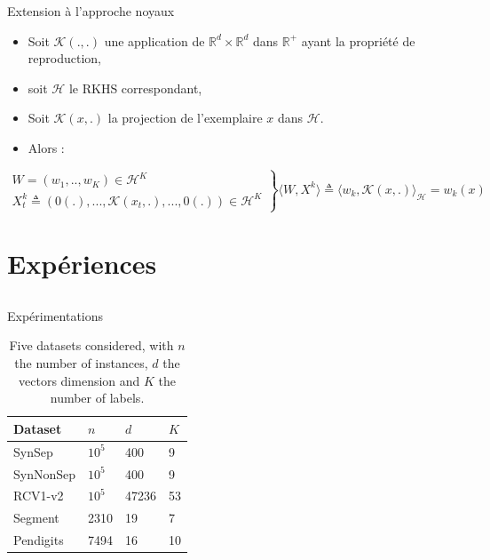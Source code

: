 \documentclass{beamer}
\begin{document}
\begin{frame}{Extension à l'approche noyaux}

	\begin{itemize}
		\item Soit $\mathcal{K}(.,.)$ une application de $ \mathbb{R}^d \times \mathbb{R}^d$ dans $ \mathbb{R}^+$ ayant la propriété de reproduction,
		\item soit $\mathcal{H}$ le RKHS correspondant,
	\item Soit $\mathcal{K}(x,.)$ la projection de l'exemplaire $x$ dans $\mathcal{H}$. 
	\item Alors : 
	\end{itemize}
	\begin{footnotesize}
	\begin{exampleblock}{}
		$
		\left.
		\begin{array}{l}
		W = (w_1,..,w_K) \in \mathcal{H}^K\\
		X_t^k \triangleq (0(.), ..., \mathcal{K}(x_t,.), ..., 0(.)) \in \mathcal{H}^{K}
		\end{array}
		\right\}
		\langle W,X^k\rangle \triangleq \langle w_k,\mathcal{K}(x,.)\rangle_\mathcal{H} = w_k(x)
		$
		
	\end{exampleblock}
	\end{footnotesize}	
\end{frame}

\section{Expériences}
\subsection{}

\begin{frame}{Expérimentations}
	\begin{table}[h]
		\caption{Five datasets considered, with $n$ the number of instances, $d$ the vectors dimension and $K$ the number of labels.}
		\label{table:mce}
		\begin{center}
			\begin{tabular}{l l l l}
				{\bf Dataset}  & {\bf $n$} & {\bf $d$} & {\bf $K$}\\
				\hline
				SynSep & $10^5$ 	& 400 	& 9 \\
				
				SynNonSep & $10^5$ & 400 	& 9 \\
				
				RCV1-v2  & $10^5$ 	& 47236 	& 53 \\
				
				Segment & 2310	& 19	& 7	\\
				
				Pendigits 	& 7494	& 16	& 10	\\
			\end{tabular}
		\end{center}
	\end{table}
\end{frame}
\end{document}
